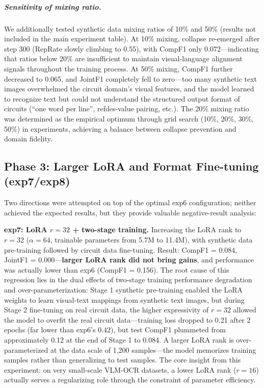 \subparagraph{Sensitivity of mixing ratio.}
We additionally tested synthetic data mixing ratios of 10\% and 50\% (results not included in the main experiment table). At 10\% mixing, collapse re-emerged after step 300 (RepRate slowly climbing to 0.55), with CompF1 only 0.072---indicating that ratios below 20\% are insufficient to maintain visual-language alignment signals throughout the training process. At 50\% mixing, CompF1 further decreased to 0.065, and JointF1 completely fell to zero---too many synthetic text images overwhelmed the circuit domain's visual features, and the model learned to recognize text but could not understand the structured output format of circuits (``one word per line'', refdes-value pairing, etc.). The 20\% mixing ratio was determined as the empirical optimum through grid search (10\%, 20\%, 30\%, 50\%) in experiments, achieving a balance between collapse prevention and domain fidelity.

\subsection{Phase 3: Larger LoRA and Format Fine-tuning (exp7/exp8)}

Two directions were attempted on top of the optimal exp6 configuration; neither achieved the expected results, but they provide valuable negative-result analysis:

\textbf{exp7: LoRA $r=32$ + two-stage training.}
Increasing the LoRA rank to $r=32$ ($\alpha=64$, trainable parameters from 5.7M to 11.4M), with synthetic data pre-training followed by circuit data fine-tuning. Result: CompF1 = 0.084, JointF1 = 0.000---\textbf{larger LoRA rank did not bring gains}, and performance was actually lower than exp6 (CompF1 = 0.156). The root cause of this regression lies in the dual effects of two-stage training performance degradation and over-parameterization: Stage 1 synthetic pre-training enabled the LoRA weights to learn visual-text mappings from synthetic text images, but during Stage 2 fine-tuning on real circuit data, the higher expressivity of $r=32$ allowed the model to overfit the real circuit data---training loss dropped to 0.21 after 2 epochs (far lower than exp6's 0.42), but test CompF1 plummeted from approximately 0.12 at the end of Stage 1 to 0.084. A larger LoRA rank is over-parameterized at the data scale of 1,200 samples---the model memorizes training samples rather than generalizing to test samples. The core insight from this experiment: on very small-scale VLM-OCR datasets, a lower LoRA rank ($r=16$) actually serves a regularizing role through the constraint of parameter efficiency.

